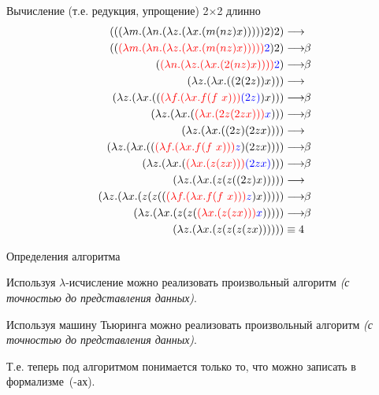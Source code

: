 \begin{frame}{Вычисление (т.е. редукция, упрощение) 2$\times$2 длинно}
\def\betaarr{\longrightarrow\!\!\beta}
\def\numTWO{\ensuremath{\lam{f}{\lam{x}{f(f\ x)}}}}
\setcounter{equation}{0}
\vspace{-2em}
\begin{align}
  \app{\app{\lam{m}{\lam{n}{\lam{z}{\lam{x}{(m \app{n}{z} x)}}}}}{2}}{2} & \longrightarrow \\
  \app{\redex{\lam{m}{\lam{n}{\lam{z}{\lam{x}{(m \app{n}{z} x)}}}}}{2}}{2} & \betaarr \\
  \redex{\lam{n}{\lam{z}{\lam{x}{(2 \app{n}{z} x)}}}}{2} & \betaarr \\
  \lam{z}{\lam{x}{\app{\app{2}{\app{2}{z}}}{x}}} & \longrightarrow \\
  \lam{z}{\lam{x}{\app{\redex{\numTWO}{\app{2}{z}}}{x}}} & \betaarr \\
  \lam{z}{\lam{x}{\redex{\lam{x}{(2 z (2 z x))}}{x}}} & \betaarr \\
  \lam{z}{\lam{x}{\app{\app{2}{z}}{(2 z x)}}} & \longrightarrow \\
  \lam{z}{\lam{x}{\app{\redex{\numTWO}{z}}{(2 z x)}}} & \betaarr \\
  \lam{z}{\lam{x}{\redex{\lam{x}{\app{z}{\app{z}{x}}}}{(2 z x)}}} & \betaarr \\
  \lam{z}{\lam{x}{\app{z}{\app{z}{\app{\app{2}{z}}{x}}}}} & \longrightarrow \\
    \lam{z}{\lam{x}{\app{z}{\app{z}{\app{\redex{\numTWO}{z}}{x}}}}} & \betaarr \\
  \lam{z}{\lam{x}{\app{z}{\app{z}{\redex{\lam{x}{\app{z}{\app{z}{x}}}}{x}}}}} & \betaarr \\
  \lam{z}{\lam{x}{\app{z}{\app{z}{\app{z}{\app{z}{x}}}}}} & \equiv 4
\end{align}
\end{frame}

\begin{frame}{Определения алгоритма}
 \begin{theorem}
  Используя $\lambda$-исчисление можно реализовать произвольный алгоритм
  \emph{(с точностью до представления данных)}.
\end{theorem}
\begin{theorem}
Используя машину Тьюринга можно реализовать произвольный алгоритм
\emph{(с точностью до представления данных)}.
\end{theorem}
\vspace{1em}
Т.е. теперь под алгоритмом понимается только то, что можно записать в формализ\-ме~(-ах).
\end{frame}



